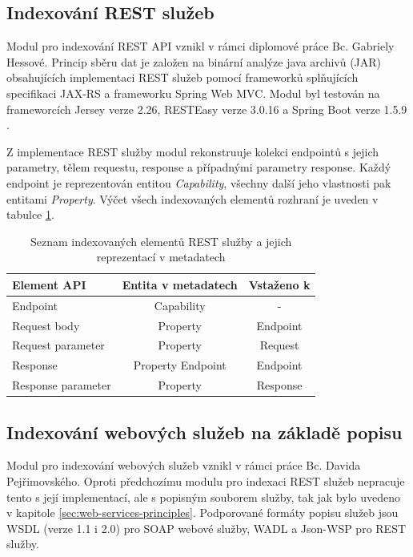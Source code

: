 \documentclass[czech,DP]{thesiskiv}
\begin{document}
\subsection{Indexování REST služeb}

Modul pro indexování REST API vznikl v rámci diplomové práce Bc. Gabriely Hessové. Princip sběru dat je založen na binární analýze java archivů (JAR) obsahujících implementaci REST služeb pomocí frameworků splňujících specifikaci JAX-RS a frameworku Spring Web MVC. Modul byl testován na frameworcích Jersey verze 2.26, RESTEasy verze 3.0.16 a  Spring Boot verze 1.5.9 \cite{hessova2015rest}.

Z implementace REST služby modul rekonstruuje kolekci endpointů s jejich parametry, tělem requestu, response a případnými parametry response. Každý endpoint je reprezentován entitou \textit{Capability}, všechny další jeho vlastnosti pak entitami \textit{Property}. Výčet všech indexovaných elementů rozhraní je uveden v tabulce \ref{tab:rest-indexed}.

\begin{table}[h]
	\centering
	\begin{tabular}{|l | c | c |}
		\hline
		Element API & Entita v metadatech & Vstaženo k\\
		\hline
		\hline
		Endpoint & Capability & - \\
		\hline
		Request body & Property & Endpoint \\
		\hline
		Request parameter & Property & Request \\
		\hline
		Response & Property Endpoint & Endpoint \\
		\hline
		Response parameter & Property & Response \\
		\hline
	\end{tabular}
	\caption{Seznam indexovaných elementů REST služby a jejich reprezentací v metadatech}
	\label{tab:rest-indexed}
\end{table}

\subsection{Indexování webových služeb na základě popisu}

Modul pro indexování webových služeb vznikl v rámci práce Bc. Davida Pejřimovského. Oproti předchozímu modulu pro indexaci REST služeb nepracuje tento s její implementací, ale s popisným souborem služby, tak jak bylo uvedeno v kapitole \ref{sec:web-services-principles}. Podporované formáty popisu služeb jsou WSDL (verze 1.1 i 2.0) pro SOAP webové služby, WADL a Json-WSP pro REST služby\cite{pejrimovsky2015ws}.
\end{document}
